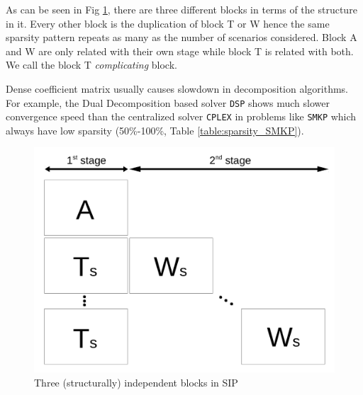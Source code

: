 

As can be seen in Fig \ref{fig:stagewise_sparsity}, there are three different blocks in terms of the structure in it. Every other block is the duplication of block T or W hence the same sparsity pattern repeats as many as the number of scenarios considered. Block A and W are only related with their own stage while block T is related with both. We call the block T \textit{complicating} block. 

Dense coefficient matrix usually causes slowdown in decomposition algorithms. For example, the Dual Decomposition based solver \texttt{DSP} shows much slower convergence speed than the centralized solver \texttt{CPLEX} in problems like \texttt{SMKP} which always have low sparsity (50\%-100\%, Table \ref{table:sparsity_SMKP}).
\begin{figure}
	\centering
	\includegraphics[width=0.7\linewidth]{drawings/stagewise_sparsity}
	\caption{Three (structurally) independent blocks in SIP}
	\label{fig:stagewise_sparsity}
\end{figure}









